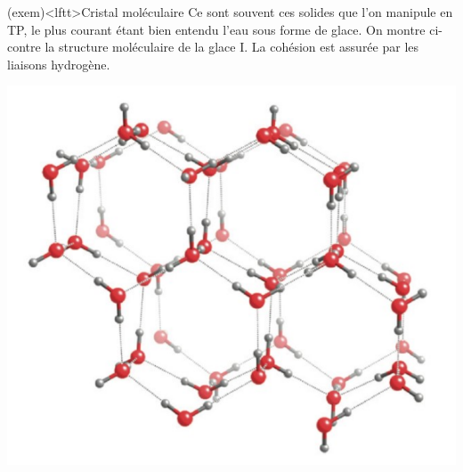 \documentclass[../../main/main.tex]{subfiles}
\begin{document}
\begin{tcb}[sidebyside, righthand ratio=.3](exem)<lftt>{Cristal moléculaire}
	Ce sont souvent ces solides que l'on manipule en TP, le plus courant étant
	bien entendu l'eau sous forme de glace. On montre ci-contre la structure
	moléculaire de la glace I. La cohésion est assurée par les liaisons hydrogène.
	\tcblower
	\begin{center}
		\includegraphics[width=\linewidth]{crist_mol_exem}
	\end{center}
\end{tcb}

\def\rght{1.00}
\end{document}
